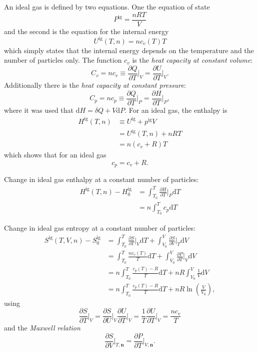\documentclass[internal,english]{sintefmemo2012}
\newcommand{\pone}[3]{\frac{\partial #1}{\partial #2}\bigg|_{#3}}%
\newcommand*{\vektor}[1]{\boldsymbol{#1}}%
\newcommand{\dd}[1]{\mathrm{d}{#1}}
\begin{document}
An ideal gas is defined by two equations. One the equation of state
\begin{equation}
  P^\text{ig} = \frac{nRT}{V}
  \label{eq:idealgaslaw}
\end{equation}
and the second is the equation for the internal energy
\begin{equation}
  U^\text{ig}(T,n) = n c_v(T) T
  \label{eq:U_ideal}
\end{equation}
which simply states that the internal energy depends on the temperature and the number of particles only. The function $c_v$
is the \textit{heat capacity at constant volume}: 
\begin{equation}
  C_v = n c_v \equiv \pone{Q}{T}{V} = \pone{U}{T}{V}.
  \label{}
\end{equation}
Additionally there is the \textit{heat capacity at constant pressure}:
\begin{equation}
  C_p = n c_p \equiv \pone{Q}{T}{P} = \pone{H}{T}{P},
  \label{}
\end{equation}
where it was used that $\dd{H} = \delta Q + V\dd{P}$.
For an ideal gas, the enthalpy is 
\begin{align}
  H^\text{ig}(T,n) &\equiv U^\text{ig} + p^\text{ig}V 
  \nonumber\\
  &= U^\text{ig}(T,n) + nRT
  \nonumber\\
  &= n\left( c_v + R \right)T
  \label{}
\end{align}
which shows that for an ideal gas
\begin{equation}
  c_p = c_v + R.
  \label{}
\end{equation}

Change in ideal gas enthalpy at a constant number of particles:
\begin{align}
  H^\text{ig}(T,n) - H^\text{ig}_0 &= \int_{T_0}^T \pone{H}{T}{P} \dd{T}
  \nonumber\\
   &= n \int_{T_0}^T c_p \dd{T}
  \label{}
\end{align}

Change in ideal gas entropy at a constant number of particles:
\begin{align}
  S^\text{ig}(T,V,n) - S^\text{ig}_0 
  &= \int_{T_0}^T \pone{S}{T}{V} \dd{T} + \int_{V_0}^V \pone{S}{V}{T} \dd{V}
    \nonumber\\
    &=\int_{T_0}^T \frac{n c_v(T)}{T} \dd{T}
    + \int_{V_0}^V \pone{P}{T}{V} \dd{V}
    \nonumber\\
    &=n\int_{T_0}^T \frac{c_p(T) - R}{T} \dd{T}
    + nR\int_{V_0}^V \frac{1}{V} \dd{V}
    \nonumber\\
    &=n\int_{T_0}^T \frac{c_p(T) - R}{T} \dd{T}
    + nR\ln \left( \frac{V}{V_0} \right),
  \label{}
\end{align}
using 
\begin{equation}
  \pone{S}{T}{V} = \pone{S}{U}{V} \pone{U}{T}{V} = \frac{1}{T} \pone{U}{T}{V} = \frac{n c_v}{T} 
  \label{}
\end{equation}
and the \textit{Maxwell relation}
\begin{equation}
\label{eq:dsrel}
\pone{S}{V}{T,\vektor{n}} = \pone{P}{T}{V,\vektor{n}}.
\end{equation}
\end{document}
